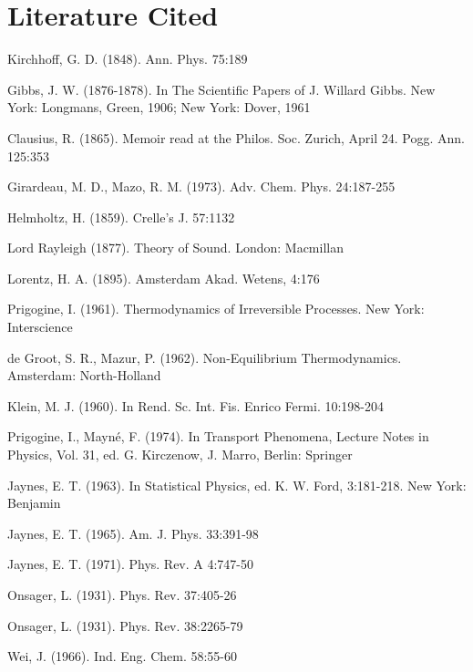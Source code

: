 \documentclass{article}
\begin{document}
\section*{Literature Cited}

\begin{thebibliography}{99}  %

 Kirchhoff, G. D. (1848). Ann. Phys. 75:189

 Gibbs, J. W. (1876-1878). In The Scientific Papers of J. Willard Gibbs. New York: Longmans, Green, 1906; New York: Dover, 1961

 Clausius, R. (1865). Memoir read at the Philos. Soc. Zurich, April 24. Pogg. Ann. 125:353

 Girardeau, M. D., Mazo, R. M. (1973). Adv. Chem. Phys. 24:187-255

 Helmholtz, H. (1859). Crelle's J. 57:1132

 Lord Rayleigh (1877). Theory of Sound. London: Macmillan

 Lorentz, H. A. (1895). Amsterdam Akad. Wetens, 4:176

 Prigogine, I. (1961). Thermodynamics of Irreversible Processes. New York: Interscience

 de Groot, S. R., Mazur, P. (1962). Non-Equilibrium Thermodynamics. Amsterdam: North-Holland

 Klein, M. J. (1960). In Rend. Sc. Int. Fis. Enrico Fermi. 10:198-204

 Prigogine, I., Mayné, F. (1974). In Transport Phenomena, Lecture Notes in Physics, Vol. 31, ed. G. Kirczenow, J. Marro, Berlin: Springer

 Jaynes, E. T. (1963). In Statistical Physics, ed. K. W. Ford, 3:181-218. New York: Benjamin

 Jaynes, E. T. (1965). Am. J. Phys. 33:391-98

 Jaynes, E. T. (1971). Phys. Rev. A 4:747-50

 Onsager, L. (1931). Phys. Rev. 37:405-26

 Onsager, L. (1931). Phys. Rev. 38:2265-79

 Wei, J. (1966). Ind. Eng. Chem. 58:55-60


\end{thebibliography}
\end{document}
